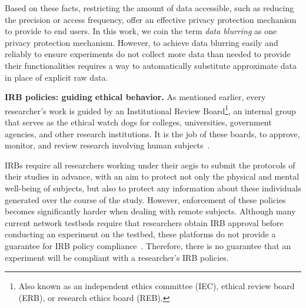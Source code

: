 Based on these facts, restricting 
the amount of data accessible, such as reducing the precision or 
access frequency, offer an effective privacy protection mechanism to 
provide to end users. In this work, we coin the term \textit{data blurring}
as one privacy protection mechanism. However, to achieve data blurring easily and reliably to 
ensure experiments do not collect more data than needed to provide 
their functionalities requires a way to automatically substitute approximate 
data in place of explicit raw data.

\textbf{IRB policies: guiding ethical behavior.}
As mentioned earlier, every researcher's work is guided by an 
Institutional Review Board\footnote{\scriptsize Also known as an 
independent ethics committee (IEC), ethical review board (ERB), 
or research ethics board (REB).}, an internal group that serves as 
the ethical watch dogs for colleges, universities, government agencies, 
and other research institutions. It is the job of these boards, 
to approve, monitor, and review research involving human 
subjects~\cite{irb}. 
\begin{comment}
While a commitment to ethical treatment of humans who 
submit to experiments has always been part of the professional codes of most 
scientists, IRBs did not become ubiquitous in research facilities until the 
latter part of the 20th century.  Partly provoked by atrocities committed by 
the Nazis in the name of scientific experiments in the Second World War II, 
and partly inspired by directives from the medical community, including 
Declaration of Helsinki established In 1964 by the World Medical Association, 
research institutions formally acknowledged the need to protect human subjects 
in any research setting. Today, 
\end{comment}
IRBs require all researchers working under 
their aegis to submit the protocols of their studies in advance, with an aim to 
protect not only the physical and mental well-being of subjects, 
but also to protect any information about these individuals generated 
over the course of the study. However, enforcement of these policies becomes significantly harder when dealing with remote subjects. Although many current network 
testbeds require that researchers obtain IRB approval before conducting
an experiment on the testbed, these platforms do not provide a guarantee 
for IRB policy compliance~\cite{nandugudi2013phonelab, nikravesh2015mobilyzer}.
Therefore, there is no guarantee that an 
experiment will be compliant with a researcher's IRB policies. 

